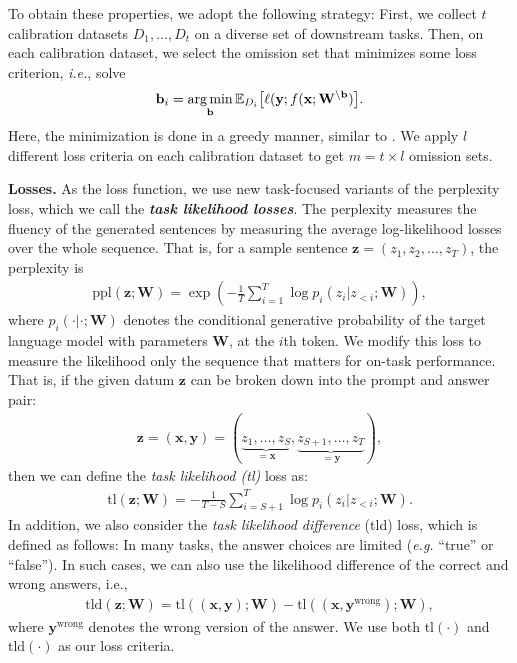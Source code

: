 To obtain these properties, we adopt the following strategy: First, we collect $t$ calibration datasets $D_1,\ldots,D_t$ on a diverse set of downstream tasks. Then, on each calibration dataset, we select the omission set that minimizes some loss criterion, \textit{i.e.}, solve
\begin{align}
\mathbf{b}_i = \operatorname*{arg\,min}_{\mathbf{b}} \mathbb{E}_{D_i}\big[\ell(\mathbf{y};f(\mathbf{x};\mathbf{W}^{\setminus \mathbf{b}})\big].
\end{align}
Here, the minimization is done in a greedy manner, similar to \citet{songsleb}. We apply $l$ different loss criteria on each calibration dataset to get $m = t \times l$ omission sets.

\textbf{Losses.} As the loss function, we use new task-focused variants of the perplexity loss, which we call the \textit{\textbf{task likelihood losses}}. The perplexity measures the fluency of the generated sentences by measuring the average log-likelihood losses over the whole sequence. That is, for a sample sentence $\mathbf{z} = (z_1,z_2,\ldots,z_T)$, the perplexity is
\begin{align}
\mathrm{ppl}(\mathbf{z};\mathbf{W}) = \exp\left(-\frac{1}{T}\sum_{i=1}^{T} \log p_i(z_i|z_{<i};\mathbf{W})\right), \label{eq:perp}
\end{align}
where $p_i(\cdot|\cdot;\mathbf{W})$ denotes the conditional generative probability of the target language model with parameters $\mathbf{W}$, at the $i$th token. We modify this loss to measure the likelihood only the sequence that matters for on-task performance. That is, if the given datum $\mathbf{z}$ can be broken down into the prompt and answer pair:
\begin{align}
\mathbf{z} = (\mathbf{x},\mathbf{y}) = (\underbrace{z_1,\ldots,z_S}_{=\mathbf{x}},\underbrace{z_{S+1},\ldots,z_{T}}_{=\mathbf{y}}),
\end{align}
then we can define the \textit{task likelihood (tl)} loss as:
\begin{align}
\mathrm{tl}(\mathbf{z};\mathbf{W}) = -\frac{1}{T-S}\sum_{i=S+1}^{T} \log p_i(z_i|z_{<i};\mathbf{W}).\label{eq:tl}
\end{align}
In addition, we also consider the \textit{task likelihood difference} (tld) loss, which is defined as follows: In many tasks, the answer choices are limited (\textit{e.g.} ``true'' or ``false''). In such cases, we can also use the likelihood difference of the correct and wrong answers, i.e., 
\begin{align}
\mathrm{tld}(\mathbf{z};\mathbf{W}) = \mathrm{tl}((\mathbf{x},\mathbf{y});\mathbf{W}) - \mathrm{tl}((\mathbf{x},\mathbf{y}^{\mathrm{wrong}});\mathbf{W}),\label{eq:tld}
\end{align}
where $\mathbf{y}^{\mathrm{wrong}}$ denotes the wrong version of the answer. We use both $\mathrm{tl}(\cdot)$ and $\mathrm{tld}(\cdot)$ as our loss criteria.

